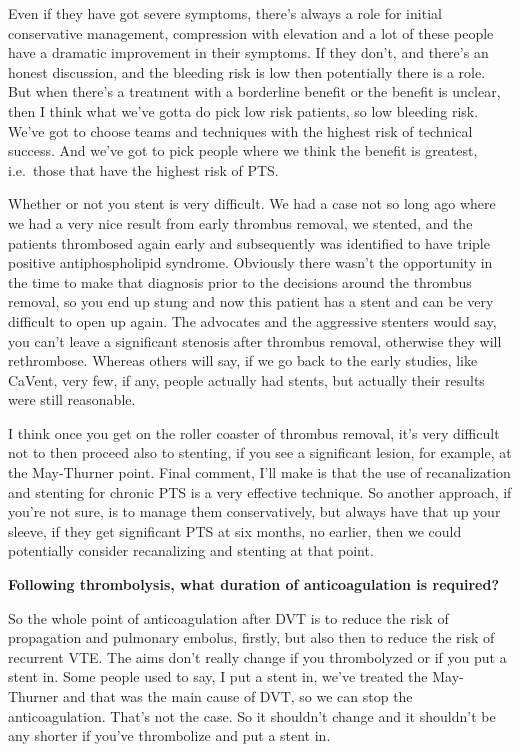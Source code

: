 \documentclass[
]{book}
\begin{document}
Even if they have got severe symptoms, there's always a role for initial
conservative management, compression with elevation and a lot of these
people have a dramatic improvement in their symptoms. If they don't, and
there's an honest discussion, and the bleeding risk is low then
potentially there is a role. But when there's a treatment with a
borderline benefit or the benefit is unclear, then I think what we've
gotta do pick low risk patients, so low bleeding risk. We've got to
choose teams and techniques with the highest risk of technical success.
And we've got to pick people where we think the benefit is greatest,
i.e.~those that have the highest risk of PTS.

Whether or not you stent is very difficult. We had a case not so long
ago where we had a very nice result from early thrombus removal, we
stented, and the patients thrombosed again early and subsequently was
identified to have triple positive antiphospholipid syndrome. Obviously
there wasn't the opportunity in the time to make that diagnosis prior to
the decisions around the thrombus removal, so you end up stung and now
this patient has a stent and can be very difficult to open up again. The
advocates and the aggressive stenters would say, you can't leave a
significant stenosis after thrombus removal, otherwise they will
rethrombose. Whereas others will say, if we go back to the early
studies, like CaVent, very few, if any, people actually had stents, but
actually their results were still reasonable.

I think once you get on the roller coaster of thrombus removal, it's
very difficult not to then proceed also to stenting, if you see a
significant lesion, for example, at the May-Thurner point.\citep{wang2018, meissner2012, rollo2017} Final comment, I'll make is that the use of
recanalization and stenting for chronic PTS is a very effective
technique. So another approach, if you're not sure, is to manage them
conservatively, but always have that up your sleeve, if they get
significant PTS at six months, no earlier, then we could potentially
consider recanalizing and stenting at that point.

\textbf{Following thrombolysis, what duration of anticoagulation is
required?}

So the whole point of anticoagulation after DVT is to reduce the risk of
propagation and pulmonary embolus, firstly, but also then to reduce the
risk of recurrent VTE. The aims don't really change if you thrombolyzed
or if you put a stent in. Some people used to say, I put a stent in,
we've treated the May-Thurner and that was the main cause of DVT, so we
can stop the anticoagulation. That's not the case. So it shouldn't
change and it shouldn't be any shorter if you've thrombolize and put a
stent in.
\end{document}
